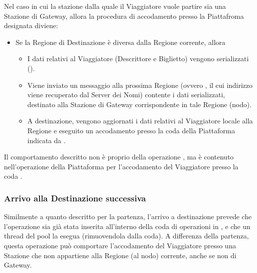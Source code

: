 	Nel caso in cui la stazione dalla quale il Viaggiatore vuole partire sia una Stazione di Gateway, allora la procedura di accodamento presso la Piattafroma designata diviene:
	\begin{itemize}
		\item Se la Regione di Destinazione  è diversa dalla Regione corrente, allora
			\begin{itemize}
				\item I dati relativi al Viaggiatore (Descrittore e Biglietto) vengono serializzati ().
				\item Viene inviato un messaggio alla prossima Regione (ovvero , il cui indirizzo viene recuperato dal Server dei Nomi) contente i dati serializzati, destinato alla Stazione di Gateway corrispondente in tale Regione (nodo).
				\item A destinazione, vengono aggiornati i dati relativi al Viaggiatore locale alla Regione e eseguito un accodamento presso la coda  della Piattaforma indicata da .
			\end{itemize}
	\end{itemize}
	
	Il comportamento descritto non è proprio della operazione , ma è contenuto nell'operazione della Piattaforma per l'accodamento del Viaggiatore presso la coda . 
	
	
	
	
	\subsubsection{Arrivo alla Destinazione successiva}
		
	Similmente a quanto descritto per la partenza, l'arrivo a destinazione prevede che l'operazione  sia già stata inserita all'interno della coda di operazioni in , e che un thread del pool la esegua (rimuovendola dalla coda). A differenza della partenza, questa operazione può comportare l'accodamento del Viaggiatore presso una Stazione che non appartiene alla Regione (al nodo) corrente, anche se non di Gateway. 
	

